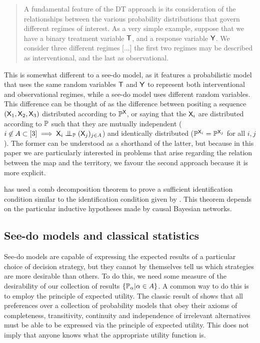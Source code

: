 \begin{quote}
A fundamental feature of the DT approach is its consideration of the relationships between the various probability distributions that govern different regimes of interest. As a very simple example, suppose that we have a binary treatment variable $\mathsf{T}$, and a response variable $\mathsf{Y}$. We consider three different regimes [...] the first two regimes may be described as interventional, and the last as observational.
\end{quote}

This is somewhat different to a see-do model, as it features a probabilistic model that uses the same random variables $\mathsf{T}$ and $\mathsf{Y}$ to represent both interventional and observational regimes, while a see-do model uses different random variables. This difference can be thought of as the difference between positing a sequence $(\mathsf{X}_1,\mathsf{X}_2,\mathsf{X}_3)$ distributed according to $\mathbb{P}^{\mathsf{X}}$, or saying that the $\mathsf{X}_i$ are distributed according to $\mathbb{P}$ such that they are mutually independent ($i\not\in A\subset[3]\implies \RV{X}_i\CI_{\prob{P}} (\RV{X}_j)_{j\in A}$) and identically distributed ($\mathbb{P}^{\mathsf{X}_i}=\mathbb{P}^{\mathsf{X}_j}$ for all $i,j$). The former can be understood as a shorthand of the latter, but because in this paper we are particularly interested in problems that arise regarding the relation between the map and the territory, we favour the second approach because it is more explicit.

\citet{jacobs_causal_2019} has used a comb decomposition theorem to prove a sufficient identification condition similar to the identification condition given by \citet{tian2002general}. This theorem depends on the particular inductive hypotheses made by causal Bayesian networks.

\subsection{See-do models and classical statistics}

See-do models are capable of expressing the expected results of a particular choice of decision strategy, but they cannot by themselves tell us which strategies are more desirable than others. To do this, we need some measure of the desirability of our collection of results $\{\mathbb{P}_\alpha|\alpha\in A\}$. A common way to do this is to employ the principle of expected utility. The classic result of \citet{von_neumann_theory_1944} shows that all preferences over a collection of probability models that obey their axioms of completeness, transitivity, continuity and independence of irrelevant alternatives must be able to be expressed via the principle of expected utility. This does not imply that anyone knows what the appropriate utility function is.

